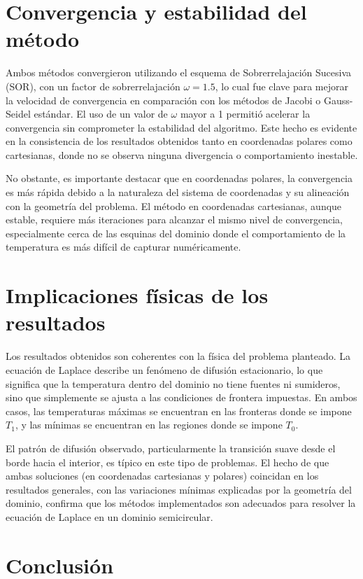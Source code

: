 \section{Convergencia y estabilidad del método}

Ambos métodos convergieron utilizando el esquema de Sobrerrelajación Sucesiva (SOR), con un factor de sobrerrelajación \(\omega = 1.5\), lo cual fue clave para mejorar la velocidad de convergencia en comparación con los métodos de Jacobi o Gauss-Seidel estándar. El uso de un valor de \(\omega\) mayor a 1 permitió acelerar la convergencia sin comprometer la estabilidad del algoritmo. Este hecho es evidente en la consistencia de los resultados obtenidos tanto en coordenadas polares como cartesianas, donde no se observa ninguna divergencia o comportamiento inestable.

No obstante, es importante destacar que en coordenadas polares, la convergencia es más rápida debido a la naturaleza del sistema de coordenadas y su alineación con la geometría del problema. El método en coordenadas cartesianas, aunque estable, requiere más iteraciones para alcanzar el mismo nivel de convergencia, especialmente cerca de las esquinas del dominio donde el comportamiento de la temperatura es más difícil de capturar numéricamente.

\section{Implicaciones físicas de los resultados}

Los resultados obtenidos son coherentes con la física del problema planteado. La ecuación de Laplace describe un fenómeno de difusión estacionario, lo que significa que la temperatura dentro del dominio no tiene fuentes ni sumideros, sino que simplemente se ajusta a las condiciones de frontera impuestas. En ambos casos, las temperaturas máximas se encuentran en las fronteras donde se impone \(T_1\), y las mínimas se encuentran en las regiones donde se impone \(T_0\).

El patrón de difusión observado, particularmente la transición suave desde el borde hacia el interior, es típico en este tipo de problemas. El hecho de que ambas soluciones (en coordenadas cartesianas y polares) coincidan en los resultados generales, con las variaciones mínimas explicadas por la geometría del dominio, confirma que los métodos implementados son adecuados para resolver la ecuación de Laplace en un dominio semicircular.

\section{Conclusión}

